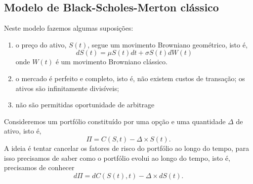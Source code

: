 \documentclass{article}
\begin{document}

\subsection{Modelo de Black-Scholes-Merton clássico}
Neste modelo fazemos algumas suposições:

\begin{enumerate}
    \item o preço do ativo, $S(t)$, segue um movimento Browniano geométrico, isto é,
\begin{equation*}
    dS(t)=\mu S(t)dt+ \sigma S(t) dW(t)
\end{equation*}
onde $W(t)$ é um movimento Browniano clássico.

    \item o mercado é perfeito e completo, isto é, não existem custos de transação; os ativos são infinitamente divisíveis;
    \item não são permitidas oportunidade de arbitrage

\end{enumerate}



\vspace{0.5cm}



Consideremos um portfólio constituído por uma opção e uma quantidade $\Delta$ de ativo, isto é, $$\Pi=C(S,t)-\Delta \times S(t).$$
A ideia é tentar cancelar os fatores de risco do portfólio ao longo do tempo, para isso precisamos de saber como o portfólio evolui ao longo do tempo, isto é, precisamos de conhecer $$d\Pi=dC(S(t),t)-\Delta \times dS(t).$$
\end{document}
